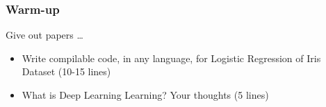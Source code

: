 

\begin{frame}[fragile]\frametitle{Warm-up}
Give out papers \ldots

\begin{itemize}
\item Write compilable code, in any language, for Logistic Regression of Iris Dataset (10-15 lines)
\item What is Deep Learning Learning? Your thoughts (5 lines)
\end{itemize}
\end{frame}
